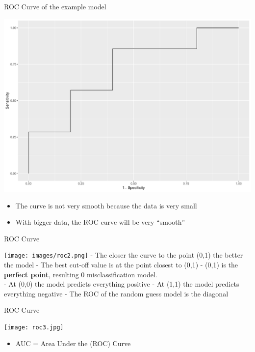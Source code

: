 \documentclass[
  ignorenonframetext,
]{beamer}
\providecommand{\tightlist}{%
  \setlength{\itemsep}{0pt}\setlength{\parskip}{0pt}}
\begin{document}
\begin{frame}{ROC Curve of the example model}
\protect\hypertarget{roc-curve-of-the-example-model}{}

\includegraphics{fa_measuring_performance2_files/figure-beamer/unnamed-chunk-5-1.pdf}

\begin{itemize}
\tightlist
\item
  The curve is not very smooth because the data is very small
\item
  With bigger data, the ROC curve will be very ``smooth''
\end{itemize}

\end{frame}

\begin{frame}{ROC Curve}
\protect\hypertarget{roc-curve-2}{}

\texttt{[image: images/roc2.png]} - The closer the curve to the point
(0,1) the better the model - The best cut-off value is at the point
closest to (0,1) - (0,1) is the \textbf{perfect point}, resulting 0
misclassification model.\\
- At (0,0) the model predicts everything positive - At (1,1) the model
predicts everything negative - The ROC of the random guess model is the
diagonal

\end{frame}

\begin{frame}{ROC Curve}
\protect\hypertarget{roc-curve-3}{}

\texttt{[image: roc3.jpg]}

\begin{itemize}
\tightlist
\item
  AUC = Area Under the (ROC) Curve
\end{itemize}

\end{frame}
\end{document}
